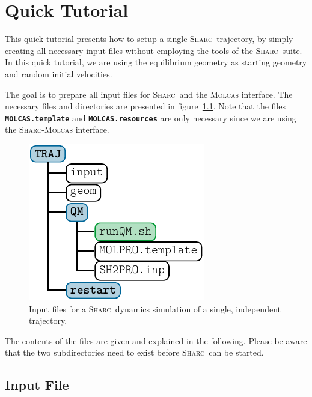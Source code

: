 \documentclass[a4paper,11pt,DIV=15,openany]{scrbook}
\newcommand{\sharc}{\textsc{Sharc}}
\newcommand{\ttt}[1]{\textbf{\texttt{#1}}}
\begin{document}

\chapter{Quick Tutorial}

This quick tutorial presents how to setup a single \sharc\ trajectory, by simply creating all necessary input files without employing the tools of the \sharc\ suite.
In this quick tutorial, we are using the equilibrium geometry as starting geometry and random initial velocities. 

The goal is to prepare all input files for \sharc\ and the \textsc{Molcas} interface. 
The necessary files and directories are presented in figure~\ref{fig:traj_dir}. 
Note that the files \ttt{MOLCAS.template} and \ttt{MOLCAS.resources} are only necessary since we are using the \sharc-\textsc{Molcas} interface.

\begin{figure}
  \centering
  \includegraphics[]{img/dir_traj/dir_traj.pdf}
  \caption{Input files for a \sharc\ dynamics simulation of a single, independent trajectory.}
  \label{fig:traj_dir}
\end{figure}

The contents of the files are given and explained in the following.
Please be aware that the two subdirectories need to exist before \sharc\ can be started.

\section{Input File}
\end{document}

